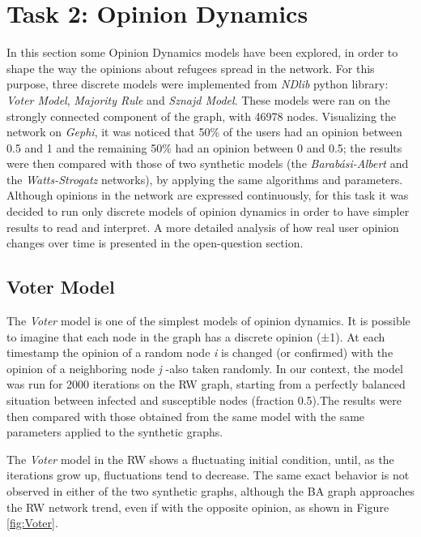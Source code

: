 \documentclass[sigchi]{acmart}
\begin{document}
\section{Task 2: Opinion Dynamics}

In this section some Opinion Dynamics models have been explored, in order to shape the way the opinions about refugees spread in the network. For this purpose, three discrete models were implemented from \textit{NDlib} python library\cite{ndlib}: \textit{Voter Model}\cite{voter}, \textit{Majority Rule}\cite{Galam_2002} and \textit{Sznajd Model}\cite{SZNAJD_WERON_2000}. These models were ran on the strongly connected component of the graph, with 46978 nodes. Visualizing the network on \textit{Gephi}, it was noticed that 50\% of the users had an opinion between 0.5 and 1 and the remaining 50\% had an opinion between 0 and 0.5; the results were then compared with those of two synthetic models (the \textit{Barabási-Albert} and the \textit{Watts-Strogatz} networks), by applying the same algorithms and parameters. 
Although opinions in the network are expressed continuously, for this task it was decided to run only discrete models of opinion dynamics in order to have simpler results to read and interpret. A more detailed analysis of how real user opinion changes over time is presented in the open-question section. 

\subsection{Voter Model}
The \textit{Voter} model is one of the simplest models of opinion dynamics. It is possible to imagine that each node in the graph has a discrete opinion (±1). At each timestamp the opinion of a random node \textit{i} is changed (or confirmed) with the opinion of a neighboring node \textit{j} -also taken randomly. In our context, the model was run for 2000 iterations on the RW graph, starting from a perfectly balanced situation between infected and susceptible nodes (fraction 0.5).The results were then compared with those obtained from the same model with the same parameters applied to the synthetic graphs. 

The \textit{Voter} model in the RW shows a fluctuating initial condition, until, as the iterations grow up, fluctuations tend to decrease. 
The same exact behavior is not observed in either of the two synthetic graphs, although the BA graph approaches the RW network trend, even if with the opposite opinion, as shown in Figure \ref{fig:Voter}.
\end{document}
